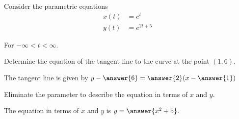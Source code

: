 \documentclass{ximera}
\author{Jason Miller}
\begin{document}
\begin{exercise}
Consider the parametric equations 
\begin{align*}
x(t) &= e^t\\
y(t) &= e^{2t+5}
\end{align*}

For $-\infty < t < \infty$.

Determine the equation of the tangent line to the curve at the point $(1,6)$. 

The tangent line is given by $y-\answer{6}=\answer{ 2 }(x-\answer{1})$

\begin{exercise}

Eliminate the parameter to describe the equation in terms of $x$ and $y$. 

The equation in terms of $x$ and $y$ is $y= \answer{x^2+5}$.


\end{exercise}
\end{exercise}
\end{document}
